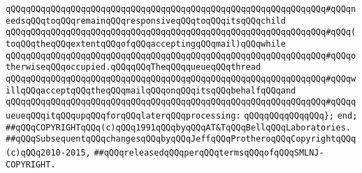 \verb|qQQqqQQqqQQqqQQqqQQqqQQqqQQqqQQqqQQqqQQqqQQqqQQqqQQqqQQqqQQqqQQq#qQQqneedsqQQqtoqQQqremainqQQqresponsiveqQQqtoqQQqitsqQQqchild|\newline
\verb|qQQqqQQqqQQqqQQqqQQqqQQqqQQqqQQqqQQqqQQqqQQqqQQqqQQqqQQqqQQqqQQq#qQQq(toqQQqtheqQQqextentqQQqofqQQqacceptingqQQqmail)qQQqwhile|\newline
\verb|qQQqqQQqqQQqqQQqqQQqqQQqqQQqqQQqqQQqqQQqqQQqqQQqqQQqqQQqqQQqqQQq#qQQqotherwiseqQQqoccupied.qQQqqQQqTheqQQqqueueqQQqthread|\newline
\verb|qQQqqQQqqQQqqQQqqQQqqQQqqQQqqQQqqQQqqQQqqQQqqQQqqQQqqQQqqQQqqQQq#qQQqwillqQQqacceptqQQqtheqQQqmailqQQqonqQQqitsqQQqbehalfqQQqand|\newline
\verb|qQQqqQQqqQQqqQQqqQQqqQQqqQQqqQQqqQQqqQQqqQQqqQQqqQQqqQQqqQQqqQQq#qQQqqueueqQQqitqQQqupqQQqforqQQqlaterqQQqprocessing:|\newline
\verb|qQQqqQQqqQQqqQQq};|\newline
\newline
\verb|end;|\newline
\newline
\newline
\verb|##qQQqCOPYRIGHTqQQq(c)qQQq1991qQQqbyqQQqAT&TqQQqBellqQQqLaboratories.|\newline
\verb|##qQQqSubsequentqQQqchangesqQQqbyqQQqJeffqQQqProtheroqQQqCopyrightqQQq(c)qQQq2010-2015,|\newline
\verb|##qQQqreleasedqQQqperqQQqtermsqQQqofqQQqSMLNJ-COPYRIGHT.|\newline
\newline

